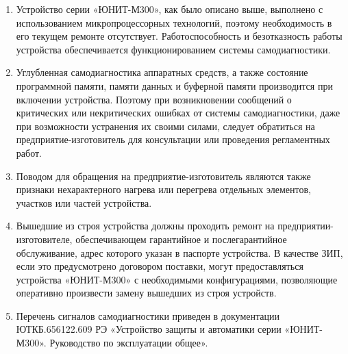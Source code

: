 \begin{enumerate}[label=\arabic{section}.\arabic{subsection}.\arabic*, labelsep=4pt, leftmargin=0pt, itemindent=57pt]

\item
Устройство серии «ЮНИТ-М300», как было описано выше, выполнено с использованием микропроцессорных технологий, поэтому необходимость в его текущем ремонте отсутствует. Работоспособность и безотказность работы устройства обеспечивается функционированием системы самодиагностики.
\item
Углубленная самодиагностика аппаратных средств, а также состояние программной памяти, памяти данных  и  буферной  памяти  производится  при  включении  устройства.  Поэтому  при  возникновении сообщений о критических или некритических ошибках от системы самодиагностики, даже при возможности устранения  их  своими  силами,  следует  обратиться  на  предприятие-изготовитель для  консультации или проведения регламентных работ.
\item 
Поводом  для  обращения  на  предприятие-изготовитель  являются  также  признаки  нехарактерного нагрева или перегрева отдельных элементов, участков или частей устройства.
\item
Вышедшие  из  строя  устройства  должны  проходить  ремонт  на  предприятии-изготовителе, обеспечивающем  гарантийное  и  послегарантийное  обслуживание, адрес которого  указан  в  паспорте устройства.  В  качестве  ЗИП,  если  это  предусмотрено  договором  поставки,  могут  предоставляться устройства  «ЮНИТ-М300» с необходимыми  конфигурациями,  позволяющие  оперативно  произвести  замену вышедших из строя устройств.
\item
Перечень сигналов самодиагностики приведен в документации ЮТКБ.656122.609 РЭ «Устройство защиты и автоматики серии «ЮНИТ-М300». Руководство по эксплуатации общее».
\end{enumerate}

